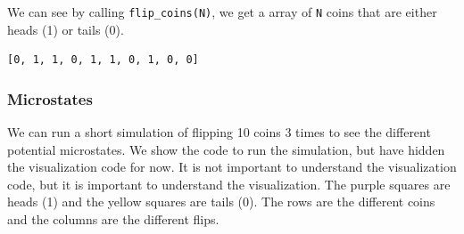 \begin{Shaded}
\begin{Highlighting}[]
\end{Highlighting}
\end{Shaded}

\begin{Shaded}
\begin{Highlighting}[]
\OperatorTok{=}\NormalTok{):}
      \OperatorTok{\textless{}} 

\OperatorTok{=}\NormalTok{):}
    \NormalTok{ [flip\_coin(prob) }\NormalTok{ \_ } \NormalTok{(coins)]}
\end{Highlighting}
\end{Shaded}

We can see by calling \texttt{flip\_coins(N)}, we get a array of
\texttt{N} coins that are either heads (1) or tails (0).

\begin{Shaded}
\begin{Highlighting}[]
\NormalTok{)}
\end{Highlighting}
\end{Shaded}

\begin{verbatim}
[0, 1, 1, 0, 1, 1, 0, 1, 0, 0]
\end{verbatim}

\subsubsection{Microstates}\label{microstates}

We can run a short simulation of flipping 10 coins 3 times to see the
different potential microstates. We show the code to run the simulation,
but have hidden the visualization code for now. It is not important to
understand the visualization code, but it is important to understand the
visualization. The purple squares are heads (1) and the yellow squares
are tails (0). The rows are the different coins and the columns are the
different flips.

